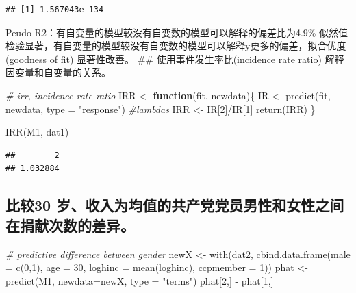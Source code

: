 \documentclass[
]{ctexart}
\newenvironment{Shaded}{\begin{snugshade}}{\end{snugshade}}
\newcommand{\AttributeTok}[1]{\textcolor[rgb]{0.77,0.63,0.00}{#1}}
\newcommand{\CommentTok}[1]{\textcolor[rgb]{0.56,0.35,0.01}{\textit{#1}}}
\newcommand{\ControlFlowTok}[1]{\textcolor[rgb]{0.13,0.29,0.53}{\textbf{#1}}}
\newcommand{\DecValTok}[1]{\textcolor[rgb]{0.00,0.00,0.81}{#1}}
\newcommand{\FunctionTok}[1]{\textcolor[rgb]{0.00,0.00,0.00}{#1}}
\newcommand{\NormalTok}[1]{#1}
\newcommand{\OtherTok}[1]{\textcolor[rgb]{0.56,0.35,0.01}{#1}}
\newcommand{\SpecialCharTok}[1]{\textcolor[rgb]{0.00,0.00,0.00}{#1}}
\newcommand{\StringTok}[1]{\textcolor[rgb]{0.31,0.60,0.02}{#1}}
\begin{document}
\begin{verbatim}
## [1] 1.567043e-134
\end{verbatim}

Peudo-R2：有自变量的模型较没有自变数的模型可以解释的偏差比为4.9\%
似然值检验显著，有自变量的模型较没有自变数的模型可以解释y更多的偏差，拟合优度(goodness
of fit) 显著性改善。 \#\# 使用事件发生率比(incidence rate ratio)
解释因变量和自变量的关系。

\begin{Shaded}
\begin{Highlighting}[]
\CommentTok{\# irr, incidence rate ratio}
\NormalTok{IRR }\OtherTok{\textless{}{-}} \ControlFlowTok{function}\NormalTok{(fit, newdata)\{}
\NormalTok{    IR }\OtherTok{\textless{}{-}} \FunctionTok{predict}\NormalTok{(fit, newdata, }\AttributeTok{type =} \StringTok{"response"}\NormalTok{) }\CommentTok{\#lambdas}
\NormalTok{    IRR }\OtherTok{\textless{}{-}}\NormalTok{ IR[}\DecValTok{2}\NormalTok{]}\SpecialCharTok{/}\NormalTok{IR[}\DecValTok{1}\NormalTok{]}
    \FunctionTok{return}\NormalTok{(IRR)}
\NormalTok{\}}

\FunctionTok{IRR}\NormalTok{(M1, dat1)}
\end{Highlighting}
\end{Shaded}

\begin{verbatim}
##        2 
## 1.032884
\end{verbatim}

\hypertarget{ux6bd4ux8f8330-ux5c81ux6536ux5165ux4e3aux5747ux503cux7684ux5171ux4ea7ux515aux515aux5458ux7537ux6027ux548cux5973ux6027ux4e4bux95f4ux5728ux6350ux732eux6b21ux6570ux7684ux5deeux5f02}{%
\subsection{比较30
岁、收入为均值的共产党党员男性和女性之间在捐献次数的差异。}\label{ux6bd4ux8f8330-ux5c81ux6536ux5165ux4e3aux5747ux503cux7684ux5171ux4ea7ux515aux515aux5458ux7537ux6027ux548cux5973ux6027ux4e4bux95f4ux5728ux6350ux732eux6b21ux6570ux7684ux5deeux5f02}}

\begin{Shaded}
\begin{Highlighting}[]
\CommentTok{\# predictive difference between gender}
\NormalTok{newX }\OtherTok{\textless{}{-}} \FunctionTok{with}\NormalTok{(dat2, }\FunctionTok{cbind.data.frame}\NormalTok{(}\AttributeTok{male =} \FunctionTok{c}\NormalTok{(}\DecValTok{0}\NormalTok{,}\DecValTok{1}\NormalTok{), }\AttributeTok{age =} \DecValTok{30}\NormalTok{, }\AttributeTok{loghinc =} \FunctionTok{mean}\NormalTok{(loghinc), }
                                    \AttributeTok{ccpmember =} \DecValTok{1}\NormalTok{))}
\NormalTok{phat }\OtherTok{\textless{}{-}} \FunctionTok{predict}\NormalTok{(M1, }\AttributeTok{newdata=}\NormalTok{newX, }\AttributeTok{type =} \StringTok{"terms"}\NormalTok{)}
\NormalTok{phat[}\DecValTok{2}\NormalTok{,] }\SpecialCharTok{{-}}\NormalTok{ phat[}\DecValTok{1}\NormalTok{,]}
\end{Highlighting}
\end{Shaded}
\end{document}
